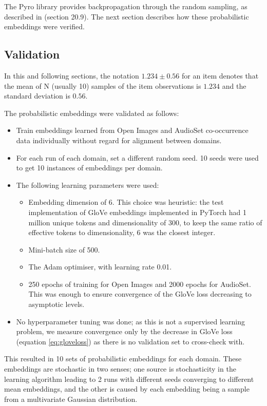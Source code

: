 The Pyro library provides backpropagation through the random sampling, as described in \cite{deeplearninggoodfellow} (section 20.9). The next section describes how these probabilistic embeddings were verified. 

\subsection{Validation}

In this and following sections, the notation $1.234 \pm 0.56$ for an item denotes that the mean of N (usually 10) samples of the item observations is $1.234$ and the standard deviation is $0.56$. 

The probabilistic embeddings were validated as follows:

\begin{itemize}
    \item Train embeddings learned from Open Images and AudioSet co-occurrence data individually without regard for alignment between domains.
    \item For each run of each domain, set a different random seed. 10 seeds were used to get 10 instances of embeddings per domain.
    \item The following learning parameters were used:
    \begin{itemize}
        \item Embedding dimension of 6. This choice was heuristic: the test implementation of GloVe embeddings implemented in PyTorch had 1 million unique tokens and dimensionality of 300, to keep the same ratio of effective tokens to dimensionality, 6 was the closest integer. 
        \item Mini-batch size of 500.
        \item The Adam \cite{kingma2017adam} optimiser, with learning rate 0.01.
        \item 250 epochs of training for Open Images and 2000 epochs for AudioSet. This was enough to ensure convergence of the GloVe loss decreasing to asymptotic levels. 
    \end{itemize}
    \item No hyperparameter tuning was done; as this is not a supervised learning problem, we measure convergence only by the decrease in GloVe loss (equation \ref{eq:gloveloss}) as there is no validation set to cross-check with. 
\end{itemize}

This resulted in 10 sets of probabilistic embeddings for each domain. These embeddings are stochastic in two senses; one source is stochasticity in the learning algorithm leading to 2 runs with different seeds converging to different mean embeddings, and the other is caused by each embedding being a sample from a multivariate Gaussian distribution. 

